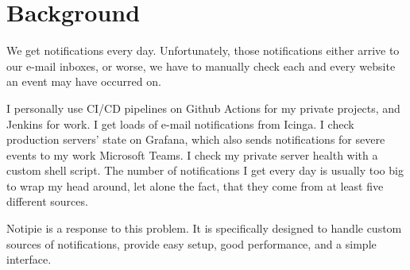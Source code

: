 \section{Background}\label{sec:background}

We get notifications every day.
Unfortunately,
those notifications either arrive
to our e-mail inboxes,
or worse,
we have to manually check
each and every website an event may have occurred on.

I personally use CI/CD pipelines
on Github Actions for my private projects,
and Jenkins for work.
I get loads of e-mail notifications from Icinga.
I check production servers' state on Grafana,
which also sends notifications
for severe events to my work Microsoft Teams.
I check my private server health
with a custom shell script.
The number of notifications I get every day
is usually too big to wrap my head around,
let alone the fact,
that they come from at least five different sources.

Notipie is a response to this problem.
It is specifically designed
to handle custom sources of notifications,
provide easy setup,
good performance,
and a simple interface.


